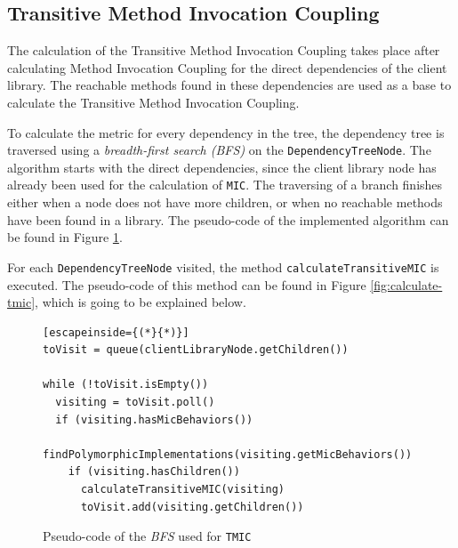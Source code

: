 \subsection{Transitive Method Invocation Coupling}\label{subsec:tmic}
The calculation of the Transitive Method Invocation Coupling takes place after calculating Method Invocation Coupling for the direct dependencies of the client library. The reachable methods found in these dependencies are used as a base to calculate the Transitive Method Invocation Coupling.

To calculate the metric for every dependency in the tree, the dependency tree is traversed using a \textit{breadth-first search (BFS)} on the \texttt{DependencyTreeNode}. The algorithm starts with the direct dependencies, since the client library node has already been used for the calculation of \texttt{MIC}. The traversing of a branch finishes either when a node does not have more children, or when no reachable methods have been found in a library. The pseudo-code of the implemented algorithm can be found in Figure \ref{fig:tree-traversing-tmic}.

For each \texttt{DependencyTreeNode} visited, the method \texttt{calculateTransitiveMIC} is executed. The pseudo-code of this method can be found in Figure \ref{fig:calculate-tmic}, which is going to be explained below.

\begin{figure}[ht!]
\begin{lstlisting}[escapeinside={(*}{*)}]
toVisit = queue(clientLibraryNode.getChildren())

while (!toVisit.isEmpty())
  visiting = toVisit.poll()
  if (visiting.hasMicBehaviors())
    findPolymorphicImplementations(visiting.getMicBehaviors())
    if (visiting.hasChildren())
      calculateTransitiveMIC(visiting)
      toVisit.add(visiting.getChildren())
\end{lstlisting}
\caption{Pseudo-code of the \textit{BFS} used for \texttt{TMIC}}
\label{fig:tree-traversing-tmic}
\end{figure}

